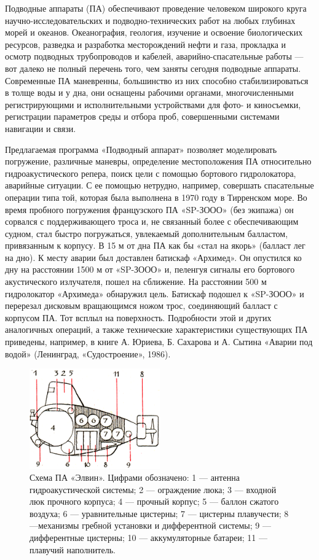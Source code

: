 \documentclass[11pt,a4paper,oneside]{article}
\begin{document}
Подводные аппараты (ПА) обеспечивают проведение человеком широкого круга научно-исследовательских и подводно-технических работ на любых глубинах морей и океанов. Океанография, геология, изучение и освоение биологических ресурсов, разведка и разработка месторождений нефти и газа, прокладка и осмотр подводных трубопроводов и кабелей, аварийно-спасательные работы — вот далеко не полный перечень того, чем заняты сегодня подводные аппараты. Современные ПА маневренны, большинство из них способно стабилизироваться в толще воды и у дна, они оснащены рабочими органами, многочисленными регистрирующими и исполнительными устройствами для фото- и киносъемки, регистрации параметров среды и отбора проб, совершенными системами навигации и связи.

Предлагаемая программа «Подводный аппарат» позволяет моделировать погружение, различные маневры, определение местоположения ПА относительно гидроакустического репера, поиск цели с помощью бортового гидролокатора, аварийные ситуации. С ее помощью нетрудно, например, совершать спасательные операции типа той, которая была выполнена в 1970 году в Тирренском море. Во время пробного погружения французского ПА «SP-ЗООО» (без экипажа) он сорвался с поддерживающего троса и, не связанный более с обеспечивающим судном, стал быстро погружаться, увлекаемый дополнительным балластом, привязанным к корпусу. В 15 м от дна ПА как бы «стал на якорь» (балласт лег на дно). К месту аварии был доставлен батискаф «Архимед». Он опустился ко дну на расстоянии 1500 м от «SP-ЗООО» и, пеленгуя сигналы его бортового акустического излучателя, пошел на сближение. На расстоянии 500 м гидролокатор «Архимеда» обнаружил цель. Батискаф подошел к «SP-ЗООО» и перерезал дисковым вращающимся ножом трос, соединяющий балласт с корпусом ПА. Тот всплыл на поверхность. Подробности этой и других аналогичных операций, а также технические характеристики существующих ПА приведены, например, в книге А. Юриева, Б. Сахарова и А. Сытина «Аварии под водой» (Ленинград, «Судостроение», 1986).

\begin{figure}[H]
\includegraphics[width=0.5\textwidth]{submarine2}
\caption{Схема ПА «Элвин». Цифрами обозначено: 1 — антенна гидроакустической системы; 2 — ограждение люка; 3 — входной люк прочного корпуса; 4 — прочный корпус; 5 — баллон сжатого воздуха; 6 — уравнительные цистерны; 7 — цистерны плавучести; 8—механизмы гребной установки и дифферентной системы; 9 — дифферентные цистерны; 10 — аккумуляторные батареи; 11 — плавучий наполнитель.}
\end{figure}
\end{document}
